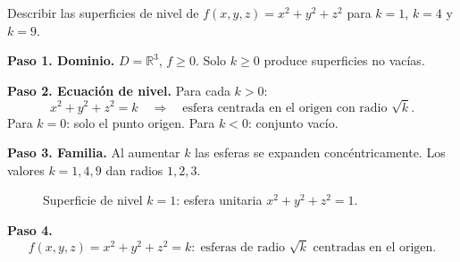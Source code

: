
\begin{example}
Describir las superficies de nivel de $f(x,y,z) = x^2+y^2+z^2$ para
$k=1$, $k=4$ y $k=9$.
\begin{myproof}
\textbf{Paso 1. Dominio.} $D=\mathbb{R}^3$, $f\ge 0$. Solo $k\ge 0$
produce superficies no vacías.

\textbf{Paso 2. Ecuación de nivel.} Para cada $k>0$:
\[
x^2+y^2+z^2 = k
\quad\Longrightarrow\quad
\text{esfera centrada en el origen con radio }\sqrt{k}.
\]
Para $k=0$: solo el punto origen. Para $k<0$: conjunto vacío.

\textbf{Paso 3. Familia.} Al aumentar $k$ las esferas se expanden
concéntricamente. Los valores $k=1,4,9$ dan radios $1, 2, 3$.

\begin{figure}[H]
\centering
{}
\caption{Superficie de nivel $k=1$: esfera unitaria $x^2+y^2+z^2=1$.}
\label{fig:nivel_esfera}
\end{figure}

\textbf{Paso 4.}
\[\boxed{f(x,y,z)=x^2+y^2+z^2=k:\;
\text{esferas de radio }\sqrt{k}\text{ centradas en el origen.}}\]
\end{myproof}
\end{example}

